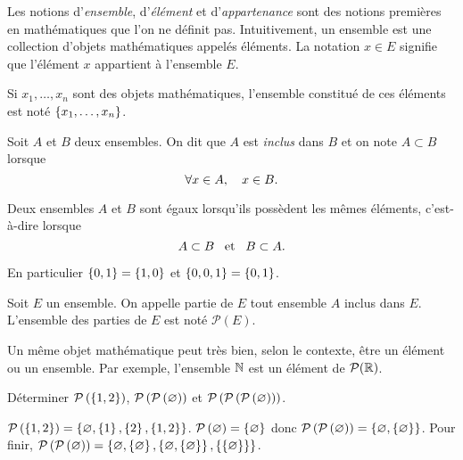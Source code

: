 \documentclass{magnolia}
\begin{document}
\begin{definition}[utile=-3]
Les notions d'\emph{ensemble}, d'\emph{élément} et d'\emph{appartenance} sont des notions
premières en mathématiques que l'on ne définit pas. Intuitivement, un ensemble
est une collection d'objets mathématiques appelés éléments. La notation $x\in E$
signifie que l'élément $x$ appartient à l'ensemble $E$.
\end{definition}

\begin{remarqueUnique}
\remarque Si $x_1,\ldots,x_n$ sont des objets mathématiques, l'ensemble
  constitué de ces éléments est noté $\left\{x_1,\ldots,x_n\right\}$.
\end{remarqueUnique}

\begin{definition}[utile=-3]
Soit $A$ et $B$ deux ensembles. On dit que $A$ est \emph{inclus} dans $B$ et on note
$A\subset B$ lorsque
\[\forall x\in A ,\quad x\in B.\]  
\end{definition}

\begin{proposition}[utile=-3]
Deux ensembles $A$ et $B$ sont égaux lorsqu'ils possèdent les mêmes
éléments, c'est-à-dire lorsque
\[A\subset B \quad\!\text{et}\quad\! B\subset A.\]
\end{proposition}

\begin{remarqueUnique}
\remarque En particulier $\left\{0,1\right\}=\left\{1,0\right\}$ et $\left\{0,0,1\right\}=\left\{0,1\right\}$.
\end{remarqueUnique}

\begin{definition}[utile=-3]
Soit $E$ un ensemble. On appelle partie de $E$ tout ensemble $A$ inclus dans $E$.
L'ensemble des parties de $E$ est noté $\mathcal{P}(E)$.
\end{definition}

\begin{remarqueUnique}
\remarque Un même objet mathématique peut très bien, selon le contexte, être un élément
  ou un ensemble. Par exemple, l'ensemble $\mathbb{N}$ est un élément de $\mathcal{P}(\mathbb{R})$.
\end{remarqueUnique}

\begin{exoUnique}
\exo Déterminer $\mathcal{P}\left(\left\{1,2\right\}\right)$,
  $\mathcal{P}\left(\mathcal{P}\left(\varnothing\right)\right)$ et $\mathcal{P}\left(\mathcal{P}\left(\mathcal{P}\left(\varnothing\right)\right)\right)$.
\end{exoUnique}

\begin{sol}
$\mathcal{P}\left(\left\{1,2\right\}\right)=\left\{\varnothing,\left\{1\right\},\left\{2\right\},\left\{1,2\right\}\right\}$. $\mathcal{P}\left(\varnothing\right)=\left\{\varnothing\right\}$ donc $\mathcal{P}\left(\mathcal{P}\left(\varnothing\right)\right)=\left\{\varnothing, \left\{\varnothing\right\}\right\}$. Pour finir, $\mathcal{P}\left(\mathcal{P}\left(\varnothing\right)\right)=\left\{\varnothing,\left\{\varnothing\right\},\left\{\varnothing,\left\{\varnothing\right\}\right\},\left\{\left\{\varnothing\right\}\right\}\right\}$.

\end{sol}
\end{document}
